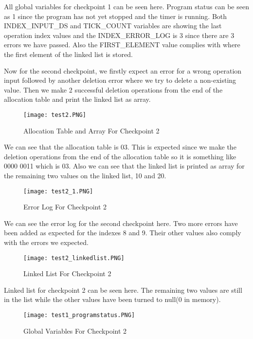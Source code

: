 \documentclass[pdftex,12pt,a4paper]{article}
\begin{document}
All global variables for checkpoint 1 can be seen here. Program status can be seen as 1 since the program has not yet stopped and the timer is running. Both INDEX\_INPUT\_DS  and TICK\_COUNT variables are showing the last operation index values and the INDEX\_ERROR\_LOG is 3 since there are 3 errors we have passed. Also the FIRST\_ELEMENT value complies with where the first element of the linked list is stored.

Now for the second checkpoint, we firstly expect an error for a wrong operation input followed by another deletion error where we try to delete a non-existing value. Then we make 2 successful deletion operations from the end of the allocation table and print the linked list as array.

\begin{figure}[H]
	\centering
	\texttt{[image: test2.PNG]}	
	\caption{Allocation Table and Array For Checkpoint 2}
	\label{fig1}
\end{figure}

We can see that the allocation table is 03. This is expected since we make the deletion operations from the end of the allocation table so it is something like 0000 0011 which is 03. Also we can see that the linked list is printed as array for the remaining two values on the linked list, 10 and 20.

\begin{figure}[H]
	\centering
	\texttt{[image: test2\_1.PNG]}	
	\caption{Error Log For Checkpoint 2}
	\label{fig1}
\end{figure}

We can see the error log for the second checkpoint here. Two more errors have been added as expected for the indexes 8 and 9. Their other values also comply with the errors we expected.

\begin{figure}[H]
	\centering
	\texttt{[image: test2\_linkedlist.PNG]}	
	\caption{Linked List For Checkpoint 2}
	\label{fig1}
\end{figure}

Linked list for checkpoint 2 can be seen here. The remaining two values are still in the list while the other values have been turned to null(0 in memory).

\begin{figure}[H]
	\centering
	\texttt{[image: test1\_programstatus.PNG]}	
	\caption{Global Variables For Checkpoint 2}
	\label{fig1}
\end{figure}
\end{document}
